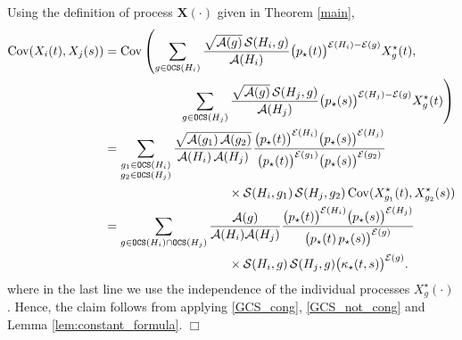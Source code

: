 \documentclass[11pt,reqno]{amsart}
\numberwithin{equation}{section}
\newcommand{\nelem}[1]{{Lemma \ref{#1}}}
\newcommand{\netheo}[1]{{Theorem \ref{#1}}}
\newcommand{\QED}{\hfill $\Box$}
\newcommand{\kb}[1]{\boldsymbol{#1}}
\newcommand{\vk}[1]{\kb{#1}}
\begin{document}
Using the definition of process {$\vk X(\cdot)$} given in \netheo{main},
\begin{align*}
    \operatorname{Cov}(X_i(t),X_j(s)) &= \operatorname{Cov}\left(\sum_{g\in{\tt OCS}({H}_i)}\frac{\sqrt{\mathcal{A}(g)}\,\mathcal{S}({H}_i,g)}{\mathcal{A}({H}_i)}\bigl(p_{\star}(t)\bigr)^{\mathcal{E}({H}_i) - \mathcal{E}(g)}X^{\star}_{g}(t),\right.\\
    &\qquad\qquad\qquad\left.\sum_{g\in{\tt OCS}({H}_j)}\frac{\sqrt{\mathcal{A}(g)}\,\mathcal{S}({H}_j,g)}{\mathcal{A}({H}_j)}\bigl(p_{\star}(s)\bigr)^{\mathcal{E}({H}_j) - \mathcal{E}(g)}X^{\star}_{g}(t)\right)\\
    &=\sum_{\substack{g_1\in {\tt OCS}({H}_i)\\ g_2\in {\tt OCS}({H}_j)}}\frac{\sqrt{\mathcal{A}(g_1)\,\mathcal{A}(g_2)}}{\mathcal{A}({H}_i)\,\mathcal{A}({H}_j)}\frac{\bigl(p_{\star}(t)\bigr)^{\mathcal{E}({H}_i)}\bigl(p_{\star}(s)\bigr)^{\mathcal{E}({H}_j)}}{\bigl(p_{\star}(t)\bigr)^{\mathcal{E}(g_1)}\bigl(p_{\star}(s)\bigr)^{\mathcal{E}(g_2)}}\\
    &\qquad\qquad\qquad\qquad\qquad\times\mathcal{S}({H}_i,g_1)\,\mathcal{S}({H}_j,g_2)\operatorname{Cov}(X_{g_1}^{\star}(t),X^{\star}_{g_2}(s))\\
    &=\sum_{\substack{g\in {\tt OCS}({H}_i)\cap{\tt OCS}({H}_j)}}{\frac{\mathcal{A}(g)}{\mathcal{A}({H}_i)\mathcal{A}({H}_j)}}\frac{\bigl(p_{\star}(t)\bigr)^{\mathcal{E}({H}_i)}\bigl(p_{\star}(s)\bigr)^{\mathcal{E}({H}_j)}}{\bigl(p_{\star}(t)\,p_{\star}(s)\bigr)^{\mathcal{E}(g)}}\\
    &\qquad\qquad\qquad\qquad\qquad\times\mathcal{S}({H}_i,{g})\,\mathcal{S}({H}_j,{g})\bigl(\kappa_{\star}(t,s)\bigr)^{\mathcal{E}(g)}.
\end{align*}
where in the last line we use the independence of the individual processes {$X^{\star}_{g}(\cdot)$}.
Hence, the claim follows from applying \eqref{GCS_cong}, \eqref{GCS_not_cong} and \nelem{lem:constant_formula}.
\QED

\medskip
\end{document}
